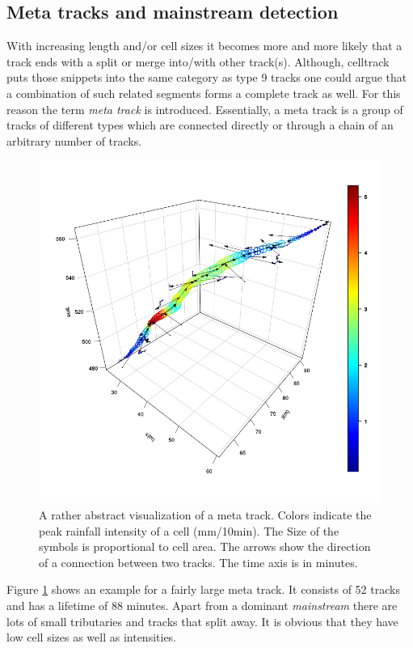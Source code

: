 \documentclass{scrartcl}
\begin{document}
\subsection{Meta tracks and mainstream detection}
With increasing length and/or cell sizes it becomes more and more likely that a track ends with a split or merge into/with other track(s). Although, celltrack puts those snippets into the same category as type 9 tracks one could argue that a combination of such related segments forms a complete track as well. For this reason the term \textit{meta track} is introduced. Essentially, a meta track is a group of tracks of different types which are connected directly or through a chain of an arbitrary number of tracks.
\begin{figure}[h]
	\centering
	\includegraphics[width=.8\linewidth]{scatter3D_meta_2}
	\caption{A rather abstract visualization of a meta track. Colors indicate the peak rainfall intensity of a cell (mm/10min). The Size of the symbols is proportional to cell area. The arrows show the direction of a connection between two tracks. The time axis is in minutes.}
	\label{meta_track}
\end{figure}
Figure \ref{meta_track} shows an example for a fairly large meta track. It consists of 52 tracks and has a lifetime of 88 minutes. Apart from a dominant \textit{mainstream} there are lots of small tributaries and tracks that split away. It is obvious that they have low cell sizes as well as intensities.
\end{document}
